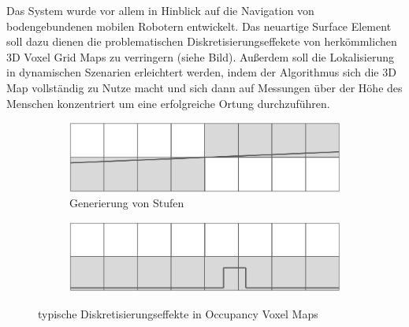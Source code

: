 Das System wurde vor allem in Hinblick auf die Navigation von bodengebundenen mobilen Robotern entwickelt. Das neuartige Surface Element soll dazu dienen die problematischen Diskretisierungseffekete von herkömmlichen 3D Voxel Grid Maps zu verringern (siehe Bild). Außerdem soll die Lokalisierung in dynamischen Szenarien erleichtert werden, indem der Algorithmus sich die 3D Map vollständig zu Nutze macht und sich dann auf Messungen über der Höhe des Menschen konzentriert um eine erfolgreiche Ortung durchzuführen.
\mbox{}
\begin{figure}
  \begin{subfigure}[t]{.5\textwidth}
    \centering
    \includegraphics[width=.9\linewidth]{pic/loesungen/12a_steps.png}
    \caption{Generierung von Stufen}
    \label{fig:s_12steps}
  \end{subfigure}\hfill
  \begin{subfigure}[t]{.5\textwidth}
    \centering
    \includegraphics[width=.9\linewidth]{pic/loesungen/12b_bumps.png}
    \caption{}
    \label{fig:s_12bumps}
  \end{subfigure}
  \caption{typische Diskretisierungseffekte in Occupancy Voxel Maps \cite{3DsurfelGridMaps}}
  \label{fig:discretization_effects}
\end{figure}
\mbox{}


